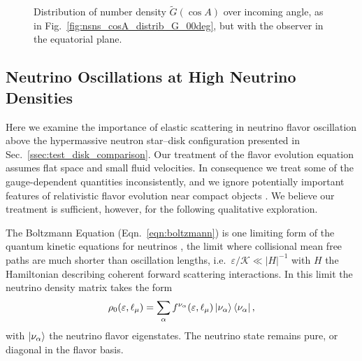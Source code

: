 \documentclass[aps,floatfix,prd,superscriptaddress,twocolumn]{revtex4-1}
\begin{document}
\begin{figure}
  \resizebox{\columnwidth}{!}{}
  \caption{Distribution of number density $\tilde{G}(\cos A)$ over incoming angle,
    as in Fig.~\ref{fig:nsns_cosA_distrib_G_00deg},
    but with the observer in the equatorial plane.}
  \label{fig:nsns_cosA_distrib_G_90deg}
\end{figure}

\subsection{Neutrino Oscillations at High Neutrino Densities}
\label{ssec:V_nunu}
Here we examine the importance of elastic scattering in neutrino
flavor oscillation above the hypermassive neutron star--disk configuration
presented in Sec.~\ref{ssec:test_disk_comparison}.
Our treatment of the flavor evolution equation assumes flat space and small fluid
velocities.
In consequence we treat some of the gauge-dependent quantities inconsistently,
and we ignore potentially important features of relativistic flavor evolution
near compact objects \cite{yang2017-gr_nu_oscillations}.
We believe our treatment is sufficient, however, for the following qualitative
exploration.

The Boltzmann Equation (Eqn.~\ref{eqn:boltzmann}) is one limiting
form of the quantum kinetic equations for neutrinos
\cite{vlas2014-neutrino_qkes},
the limit where collisional mean free paths are much shorter
than oscillation lengths, i.e.\ $\varepsilon/\mathscr{K} \ll |H|^{-1}$
with $H$ the Hamiltonian describing coherent forward scattering interactions.
In this limit the neutrino density matrix takes the form
\begin{equation}
  \label{eqn:density_rho_0}
  \rho_0(\varepsilon,\ell_\mu) =
  \sum\limits_{\alpha}f^{\nu_\alpha}(\varepsilon,\ell_\mu)
  \ket{\nu_\alpha} \bra{\nu_\alpha},
\end{equation}
with $\ket{\nu_\alpha}$ the neutrino flavor eigenstates.
The neutrino state remains pure, or diagonal in the flavor basis.
\end{document}
